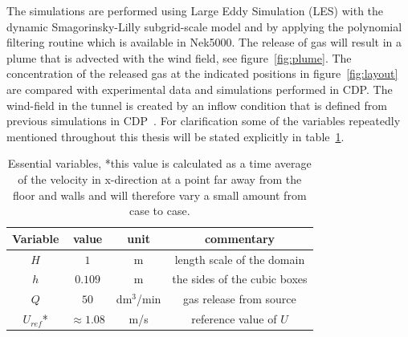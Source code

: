 The simulations are performed using Large Eddy Simulation (LES) 
with the dynamic Smagorinsky-Lilly subgrid-scale model and by applying the polynomial filtering
routine which is available in Nek5000. 
The release of gas will result in a plume that is advected with the wind field,
see figure~\ref{fig:plume}. The concentration of the released gas at the 
indicated positions in figure~\ref{fig:layout} are compared with 
experimental data and simulations performed in CDP\@. 
The wind-field in the tunnel is created by an inflow condition that is defined from previous 
simulations in CDP~\cite{eriksson}.
For clarification some of the variables repeatedly mentioned throughout this thesis will be 
stated explicitly in table~\ref{tab:simplevariables}.
\begin{table}
    \centering
    \begin{tabular}{c c c c}
        Variable & value & unit & commentary \\ \hline
        $H$   & $1$ & m & length scale of the domain \\ 
        $h$   & $0.109$ & m & the sides of the cubic boxes\\ 
        $Q$   & $50$ & dm$^3$/min & gas release from source \\ 
        $U_{ref} $*& $\approx1.08$ & m/s & reference value of $U$ \\
    \end{tabular}
    \caption{Essential variables, *this value is calculated as a time average of the velocity in 
        x-direction at a point far away from the floor and walls and will therefore 
        vary a small amount from case to case. }
    \label{tab:simplevariables}
\end{table}


